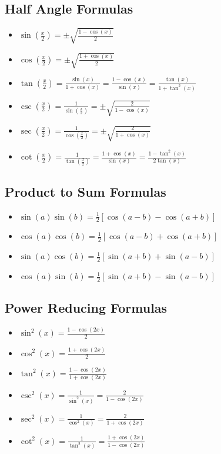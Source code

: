 \subsection{Half Angle Formulas}
\begin{itemize}[label=\(-\)]
    \item \( \sin\left(\frac{x}{2}\right) = \pm\sqrt{\frac{1 - \cos(x)}{2}} \)
    \item \( \cos\left(\frac{x}{2}\right) = \pm\sqrt{\frac{1 + \cos(x)}{2}} \)
    \item \( \tan\left(\frac{x}{2}\right) = \frac{\sin(x)}{1 + \cos(x)} = \frac{1 - \cos(x)}{\sin(x)} = \frac{\tan(x)}{1 + \tan^2(x)}\)
    \item \( \csc\left(\frac{x}{2}\right) = \frac{1}{\sin\left(\frac{x}{2}\right)} = \pm\sqrt{\frac{2}{1 - \cos(x)}} \)
    \item \( \sec\left(\frac{x}{2}\right) = \frac{1}{\cos\left(\frac{x}{2}\right)} = \pm\sqrt{\frac{2}{1 + \cos(x)}} \)
    \item \( \cot\left(\frac{x}{2}\right) = \frac{1}{\tan\left(\frac{x}{2}\right)} = \frac{1 + \cos(x)}{\sin(x)} = \frac{1 - \tan^2(x)}{2\tan(x)}\)
\end{itemize}

\subsection{Product to Sum Formulas}
\begin{itemize}[label=\(-\)]
    \item \( \sin(a)\sin(b) = \frac{1}{2}[\cos(a - b) - \cos(a + b)] \)
    \item \( \cos(a)\cos(b) = \frac{1}{2}[\cos(a - b) + \cos(a + b)] \)
    \item \( \sin(a)\cos(b) = \frac{1}{2}[\sin(a + b) + \sin(a - b)] \)
    \item \( \cos(a)\sin(b) = \frac{1}{2}[\sin(a + b) - \sin(a - b)] \)
\end{itemize}

\subsection{Power Reducing Formulas}
\begin{itemize}[label=\(-\)]
    \item \( \sin^2(x) = \frac{1 - \cos(2x)}{2} \)
    \item \( \cos^2(x) = \frac{1 + \cos(2x)}{2} \)
    \item \( \tan^2(x) = \frac{1 - \cos(2x)}{1 + \cos(2x)}\)
    \item \( \csc^2(x) = \frac{1}{\sin^2(x)} = \frac{2}{1 - \cos(2x)} \)
    \item \( \sec^2(x) = \frac{1}{\cos^2(x)} = \frac{2}{1 + \cos(2x)} \)
    \item \( \cot^2(x) = \frac{1}{\tan^2(x)} = \frac{1 + \cos(2x)}{1 - \cos(2x)}\)
\end{itemize}

